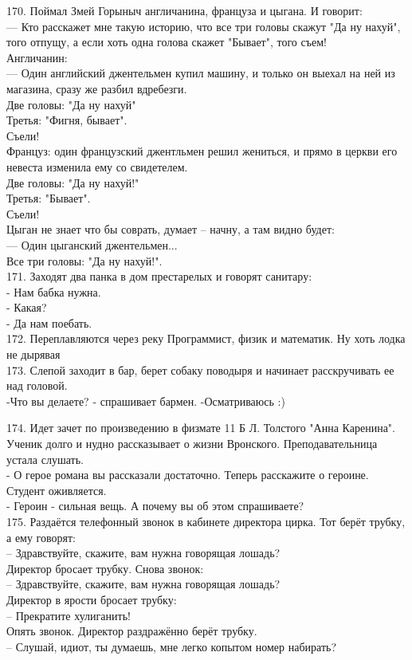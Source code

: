 \documentclass[a4paper,20pt,notitlepage]{extbook}
\begin{document}
	170. Поймал Змей Горыныч англичанина, француза и цыгана. И говорит:\\
	— Кто расскажет мне такую историю, что все три головы скажут "Да ну нахуй", того отпущу, а если хоть одна голова скажет "Бывает", того съем!\\
	Англичанин:\\
	— Один английский джентельмен купил машину, и только он выехал на ней из магазина, сразу же разбил вдребезги.\\
	Две головы: "Да ну нахуй"\\
	Третья: "Фигня, бывает".\\
	Съели!\\
	Француз: один французский джентльмен решил жениться, и прямо в церкви его невеста изменила ему со свидетелем.\\
	Две головы: "Да ну нахуй!"\\
	Третья: "Бывает".\\
	Съели!\\
	Цыган не знает что бы соврать, думает – начну, а там видно будет:\\
	— Один цыганский джентельмен...\\
	Все три головы: "Да ну нахуй!".\\
	
	171. Заходят два панка в дом престарелых и говорят санитару:\\
	- Нам бабка нужна.\\
	- Какая?\\
	- Да нам поебать.\\
	
	172. Переплавляются через реку Программист, физик и математик. Ну хоть лодка не дырявая\\
	
	173. Слепой заходит в бар, берет собаку поводыря и начинает расскручивать ее над головой.\\
	-Что вы делаете? - спрашивает бармен.
	-Осматриваюсь :)
	
	174. Идет зачет по произведению в физмате 11 Б Л. Толстого "Анна Каренина". Ученик долго и нудно рассказывает о жизни Вронского. Преподавательница устала слушать.\\
	- О герое романа вы рассказали достаточно. Теперь расскажите о героине.\\
	Студент оживляется.\\
	- Героин - сильная вещь. А почему вы об этом спрашиваете?\\
	
	175. Раздаётся телефонный звонок в кабинете директора цирка. Тот берёт трубку, а ему говорят:\\
	– Здравствуйте, скажите, вам нужна говорящая лошадь?\\
	Директор бросает трубку. Снова звонок:\\
	– Здравствуйте, скажите, вам нужна говорящая лошадь?\\
	Директор в ярости бросает трубку:\\
	– Прекратите хулиганить!\\
	Опять звонок. Директор раздражённо берёт трубку.\\
	– Слушай, идиот, ты думаешь, мне легко копытом номер набирать?\\
	
\end{document}
